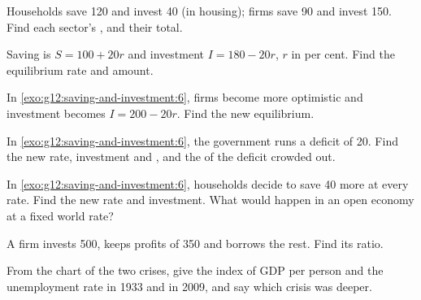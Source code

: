 \begin{exercise}[$\star$]\label{exo:g12:saving-and-investment:5}
Households save 120 and invest 40 (in housing); firms save 90 and invest 150. Find each sector's , and their total.
\end{exercise}

\begin{exercise}[$\star\star$]\label{exo:g12:saving-and-investment:6}
Saving is $S = 100 + 20r$ and investment $I = 180 - 20r$, $r$ in per cent. Find the equilibrium rate and amount.
\end{exercise}

\begin{exercise}[$\star\star$]\label{exo:g12:saving-and-investment:7}
In \cref{exo:g12:saving-and-investment:6}, firms become more optimistic and investment becomes $I = 200 - 20r$. Find the new equilibrium.
\end{exercise}

\begin{exercise}[$\star\star$]\label{exo:g12:saving-and-investment:8}
In \cref{exo:g12:saving-and-investment:6}, the government runs a deficit of 20. Find the new rate, investment and , and the  of the deficit crowded out.
\end{exercise}

\begin{exercise}[$\star\star$]\label{exo:g12:saving-and-investment:9}
In \cref{exo:g12:saving-and-investment:6}, households decide to save 40 more at every rate. Find the new rate and investment. What would happen in an open economy at a fixed
world rate?
\end{exercise}

\begin{exercise}[$\star\star$]\label{exo:g12:saving-and-investment:10}
A firm invests 500, keeps profits of 350 and borrows the rest. Find its  ratio.
\end{exercise}

\begin{exercise}[$\star\star$]\label{exo:g12:saving-and-investment:11}
From the chart of the two crises, give the index of GDP per person and the unemployment rate in 1933 and in 2009, and say which crisis was deeper.
\end{exercise}

